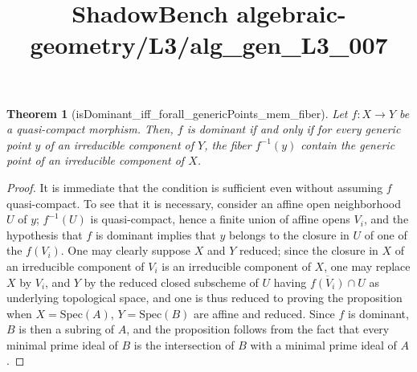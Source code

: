 \documentclass{article}
\title{ShadowBench algebraic-geometry/L3/alg\_gen\_L3\_007}
\newtheorem{theorem}{Theorem}
\begin{document}
\maketitle

\begin{theorem}[isDominant_iff_forall_genericPoints_mem_fiber]
Let \(f : X \to Y\) be a quasi-compact morphism. Then, \(f\) is dominant if and only if for every generic point \(y\) of an irreducible component of \(Y\), the fiber \(f^{-1}(y)\) contain the generic point of an irreducible component of \(X\).
\end{theorem}
\begin{proof}
It is immediate that the condition is sufficient even without assuming \(f\) quasi-compact. To see that it is necessary, consider an affine open neighborhood \(U\) of \(y\); \(f^{-1}(U)\) is quasi-compact, hence a finite union of affine opens \(V_i\), and the hypothesis that \(f\) is dominant implies that \(y\) belongs to the closure in \(U\) of one of the \(f(V_i)\). One may clearly suppose \(X\) and \(Y\) reduced; since the closure in \(X\) of an irreducible component of \(V_i\) is an irreducible component of \(X\), one may replace \(X\) by \(V_i\), and \(Y\) by the reduced closed subscheme of \(U\) having \(\overline{f(V_i)}\cap U\) as underlying topological space, and one is thus reduced to proving the proposition when \(X=\mathrm{Spec}(A)\), \(Y=\mathrm{Spec}(B)\) are affine and reduced. Since \(f\) is dominant, \(B\) is then a subring of \(A\), and the proposition follows from the fact that every minimal prime ideal of \(B\) is the intersection of \(B\) with a minimal prime ideal of \(A\).
\end{proof}
\end{document}
